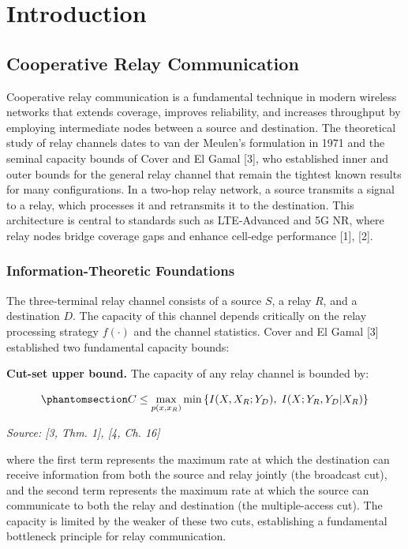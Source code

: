 \chapter{Introduction}\label{sec:introduction}

\section{Cooperative Relay Communication}\label{sec:cooperative-relay-communication}

Cooperative relay communication is a fundamental technique in modern wireless networks that extends coverage, improves reliability, and increases throughput by employing intermediate nodes between a source and destination. The theoretical study of relay channels dates to van der Meulen's formulation in 1971 and the seminal capacity bounds of Cover and El Gamal {[}3{]}, who established inner and outer bounds for the general relay channel that remain the tightest known results for many configurations. In a two-hop relay network, a source transmits a signal to a relay, which processes it and retransmits it to the destination. This architecture is central to standards such as LTE-Advanced and 5G NR, where relay nodes bridge coverage gaps and enhance cell-edge performance {[}1{]}, {[}2{]}.

\subsection{Information-Theoretic Foundations}\label{sec:information-theoretic-foundations}

The three-terminal relay channel consists of a source \(S\), a relay \(R\), and a destination \(D\). The capacity of this channel depends critically on the relay processing strategy \(f(\cdot)\) and the channel statistics. Cover and El Gamal {[}3{]} established two fundamental capacity bounds:

\textbf{Cut-set upper bound.} The capacity of any relay channel is bounded by:

\begin{equation}\protect\phantomsection\label{eq:relay-capacity-bound}{C \leq \max_{p(x, x_R)} \min\left\{I(X, X_R; Y_D), \; I(X; Y_R, Y_D | X_R)\right\}
}\end{equation} \par{\small\textit{Source: [3, Thm. 1], [4, Ch. 16]}}

where the first term represents the maximum rate at which the destination can receive information from both the source and relay jointly (the broadcast cut), and the second term represents the maximum rate at which the source can communicate to both the relay and destination (the multiple-access cut). The capacity is limited by the weaker of these two cuts, establishing a fundamental bottleneck principle for relay communication.

